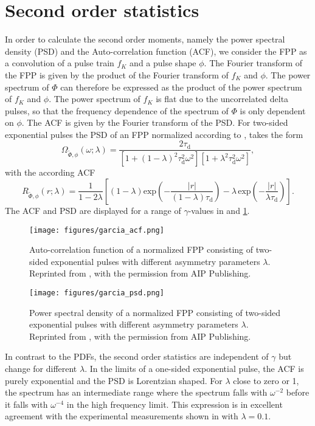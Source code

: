 \section{Second order statistics}

In order to calculate the second order moments, namely the power spectral density (PSD) and the Auto-correlation function (ACF), we consider the FPP as a convolution of a pulse train $f_K$ and a pulse shape $\phi$. The Fourier transform of the FPP is given by the product of the Fourier transform of $f_K$ and $\phi$. The power spectrum of $\Phi$ can therefore be expressed as the product of the power spectrum of $f_K$ and $\phi$. The power spectrum of $f_K$ is flat due to the uncorrelated delta pulses, so that the frequency dependence of the spectrum of $\Phi$ is only dependent on $\phi$. The ACF is given by the Fourier transform of the PSD. For two-sided exponential pulses the PSD of an FPP normalized according to , takes the form \cite{garcia2017auto}
\begin{equation}
	\Omega_{\widetilde{\Phi},\phi}(\omega;\lambda) = \frac{2 \tau_\mathrm{d}}{[1+(1-\lambda)^2\tau_\mathrm{d}^2\omega^2][1+\lambda^2\tau_\mathrm{d}^2\omega^2]},
\end{equation}
with the according ACF
\begin{equation}
	R_{\widetilde{\Phi},\phi}(r;\lambda) = \frac{1}{1-2\lambda}\left[\left(1-\lambda\right)\mathrm{exp}\left(-\frac{|r|}{(1-\lambda)\tau_\mathrm{d}}\right) -\lambda\,\mathrm{exp}\left(-\frac{|r|}{\lambda\tau_\mathrm{d}}\right)\right].
\end{equation}
The ACF and PSD are displayed for a range of $\gamma$-values in  and \ref{Fig:garcia_psd}.
\begin{figure}
	\centering
	\begin{minipage}{.48\linewidth}
		\texttt{[image: figures/garcia\_acf.png]}
		\caption{Auto-correlation function of a normalized FPP consisting of two-sided exponential pulses with different asymmetry parameters $\lambda$. Reprinted from \cite{garcia2017auto}, with the permission from AIP Publishing.}
		\label{Fig:garcia_acf}
	\end{minipage}
	\hfill
	\begin{minipage}{.48\linewidth}
		\texttt{[image: figures/garcia\_psd.png]}
		\caption{Power spectral density of a normalized FPP consisting of two-sided exponential pulses with different asymmetry parameters $\lambda$. Reprinted from \cite{garcia2017auto}, with the permission from AIP Publishing.}
		\label{Fig:garcia_psd}
	\end{minipage}
\end{figure}
In contrast to the PDFs, the second order statistics are independent of $\gamma$ but change for different $\lambda$. In the limits of a one-sided exponential pulse, the ACF is purely exponential and the PSD is Lorentzian shaped. For $\lambda$ close to zero or 1, the spectrum has an intermediate range where the spectrum falls with $\omega^{-2}$ before it falls with $\omega^{-4}$ in the high frequency limit. This expression is in excellent agreement with the experimental measurements shown in  with $\lambda=0.1$. 

